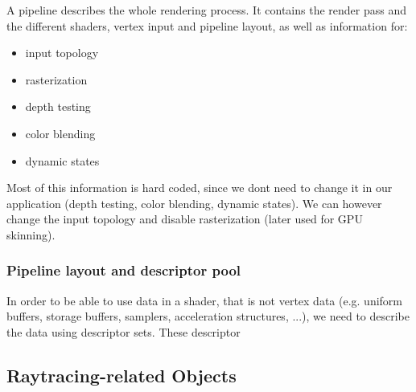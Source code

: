 A pipeline describes the whole rendering process. It contains the render pass and the different shaders, vertex input and pipeline layout, as well as information for:

\begin{itemize}
    \item input topology
    \item rasterization
    \item depth testing
    \item color blending
    \item dynamic states
\end{itemize}

Most of this information is hard coded, since we dont need to change it in our application (depth testing, color blending, dynamic states). We can however change the input topology and disable rasterization (later used for GPU skinning).

\subsubsection{Pipeline layout and descriptor pool}

In order to be able to use data in a shader, that is not vertex data (e.g. uniform buffers, storage buffers, samplers, acceleration structures, ...), we need to describe the data using descriptor sets. These descriptor 

\subsection{Raytracing-related Objects}\label{subsec:raytracing-objects}